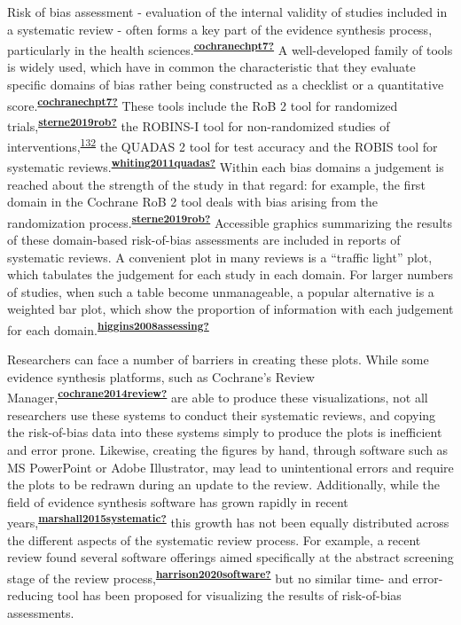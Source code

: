\documentclass[a4paper, twoside]{templates/ociamthesis}
\begin{document}
Risk of bias assessment - evaluation of the internal validity of studies included in a systematic review - often forms a key part of the evidence synthesis process, particularly in the health sciences.\textsuperscript{\protect\hyperlink{ref-cochranechpt7}{\textbf{cochranechpt7?}}} A well-developed family of tools is widely used, which have in common the characteristic that they evaluate specific domains of bias rather being constructed as a checklist or a quantitative score.\textsuperscript{\protect\hyperlink{ref-cochranechpt7}{\textbf{cochranechpt7?}}} These tools include the RoB 2 tool for randomized trials,\textsuperscript{\protect\hyperlink{ref-sterne2019rob}{\textbf{sterne2019rob?}}} the ROBINS-I tool for non-randomized studies of interventions,\textsuperscript{\protect\hyperlink{ref-sterne2016}{132}} the QUADAS 2 tool for test accuracy and the ROBIS tool for systematic reviews.\textsuperscript{\protect\hyperlink{ref-whiting2011quadas}{\textbf{whiting2011quadas?}}} Within each bias domains a judgement is reached about the strength of the study in that regard: for example, the first domain in the Cochrane RoB 2 tool deals with bias arising from the randomization process.\textsuperscript{\protect\hyperlink{ref-sterne2019rob}{\textbf{sterne2019rob?}}} Accessible graphics summarizing the results of these domain-based risk-of-bias assessments are included in reports of systematic reviews. A convenient plot in many reviews is a ``traffic light'' plot, which tabulates the judgement for each study in each domain. For larger numbers of studies, when such a table become unmanageable, a popular alternative is a weighted bar plot, which show the proportion of information with each judgement for each domain.\textsuperscript{\protect\hyperlink{ref-higgins2008assessing}{\textbf{higgins2008assessing?}}}

Researchers can face a number of barriers in creating these plots. While some evidence synthesis platforms, such as Cochrane's Review Manager,\textsuperscript{\protect\hyperlink{ref-cochrane2014review}{\textbf{cochrane2014review?}}} are able to produce these visualizations, not all researchers use these systems to conduct their systematic reviews, and copying the risk-of-bias data into these systems simply to produce the plots is inefficient and error prone. Likewise, creating the figures by hand, through software such as MS PowerPoint or Adobe Illustrator, may lead to unintentional errors and require the plots to be redrawn during an update to the review. Additionally, while the field of evidence synthesis software has grown rapidly in recent years,\textsuperscript{\protect\hyperlink{ref-marshall2015systematic}{\textbf{marshall2015systematic?}}} this growth has not been equally distributed across the different aspects of the systematic review process. For example, a recent review found several software offerings aimed specifically at the abstract screening stage of the review process,\textsuperscript{\protect\hyperlink{ref-harrison2020software}{\textbf{harrison2020software?}}} but no similar time- and error-reducing tool has been proposed for visualizing the results of risk-of-bias assessments.
\end{document}
